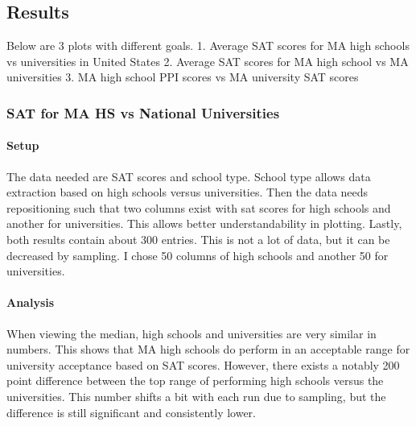 \documentclass[11pt]{article}
\begin{document}
    \subsection{Results}\label{results}

Below are 3 plots with different goals. 1. Average SAT scores for MA
high schools vs universities in United States 2. Average SAT scores for
MA high school vs MA universities 3. MA high school PPI scores vs MA
university SAT scores

\subsubsection{SAT for MA HS vs National
Universities}\label{sat-for-ma-hs-vs-national-universities}

\paragraph{Setup}\label{setup}

The data needed are SAT scores and school type. School type allows data
extraction based on high schools versus universities. Then the data
needs repositioning such that two columns exist with sat scores for high
schools and another for universities. This allows better
understandability in plotting. Lastly, both results contain about 300
entries. This is not a lot of data, but it can be decreased by sampling.
I chose 50 columns of high schools and another 50 for universities.

\paragraph{Analysis}\label{analysis}

When viewing the median, high schools and universities are very similar
in numbers. This shows that MA high schools do perform in an acceptable
range for university acceptance based on SAT scores. However, there
exists a notably 200 point difference between the top range of
performing high schools versus the universities. This number shifts a
bit with each run due to sampling, but the difference is still
significant and consistently lower.
\end{document}
